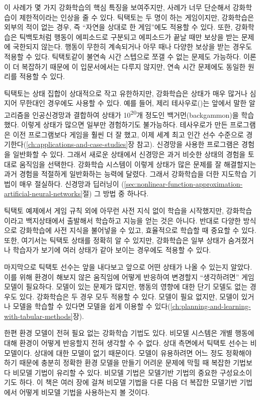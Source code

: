 이 사례가 몇 가지 강화학습의 핵심 특징을 보여주지만, 사례가 너무 단순해서
강화학습이 제한적이라는 인상을 줄 수 있다. 틱택토는 두 명이 하는 게임이지만,
강화학습은 외부의 적이 없는 경우, 즉 ``자연을 상대로 한 게임''에도 적용할 수
있다. 또한, 강화학습은 틱백토처럼 행동이 에피소드로 구분되고 에피소드가 끝날
때만 보상을 받는 문제에 국한되지 않는다. 행동이 무한히 계속되거나 아무 때나
다양한 보상을 받는 경우도 적용할 수 있다. 틱택토같이 불연속 시간 스텝으로 쪼갤
수 없는 문제도 가능하다. 이론이 더 복잡하기 때문에 이 입문서에서는 다루지
않지만, 연속 시간 문제에도 동일한 원리를 적용할 수 있다.

틱택토는 상태 집합이 상대적으로 작고 유한하지만, 강화학습은 상태가 매우 많거나
심지어 무한대인 경우에도 사용할 수 있다. 예를 들어, 제리
테사우로(\cite{Tesauro1992, Tesauro1995})는 앞에서 말한 알고리즘을 인공신경망과
결합하여 상태가 10\textsuperscript{20}개 정도인 백거먼(backgammon)을 학습했다.
이렇게 상태가 많으면 일부만 경험하기도 불가능하다. 테사우로가 만든 프로그램은
이전 프로그램보다 게임을 훨씬 더 잘 했고, 이제 세계 최고 인간 선수 수준으로
경기한다(\ref{ch:applications-and-case-studies}장 참고). 신경망을 사용한
프로그램은 경험을 일반화할 수 있다. 그래서 새로운 상태에서 신경망은 과거 비슷한
상태의 경험을 토대로 움직임을 선택한다. 강화학습 시스템이 이렇게 상태가 많은
문제를 잘 해결할지는 과거 경험을 적절하게 일반화하는 능력에 달렸다. 그래서
강화학습을 더한 지도학습 기법이 매우 절실하다. 신경망과 딥러닝이
(\ref{sec:nonlinear-function-approximation-artificial-neural-networks}절) 그
방법 중 하나다.

틱택토 예제에서 게임 규칙 외에 아무런 사전 지식 없이 학습을 시작했지만,
강화학습이라고 백지상태에서 출발해서 학습하고 지능을 얻는 것은 아니다. 반대로
다양한 방식으로 강화학습에 사전 지식을 불어넣을 수 있고, 효율적으로 학습할 때
중요할 수 있다. 또한, 여기서는 틱택토 상태를 정확히 알 수 있지만, 강화학습은
일부 상태가 숨겨졌거나 학습자가 보기에 여러 상태가 같아 보이는 경우에도 적용할
수 있다.


마지막으로 틱택토 선수는 앞을 내다보고 앞으로 어떤 상태가 나올 수 있는지 알았다.
이를 위해 환경이 해보지 않은 움직임에 어떻게 반응하여 변경할지 ``생각하려면''
게임 모델이 필요하다. 모델이 있는 문제가 많지만, 행동의 영향에 대한 단기 모델도
없는 경우도 있다. 강화학습은 두 경우 모두 적용할 수 있다. 모델이 필요 없지만,
모델이 있거나 모델을 학습할 수 있다면 모델을 쉽게 이용할 수
있다(\ref{ch:planning-and-learning-with-tabular-methods}장).

한편 환경 모델이 전혀 필요 없는 강화학습 기법도 있다. 비모델 시스템은 개별
행동에 대해 환경이 어떻게 반응할지 전혀 생각할 수 수 없다. 상대 측면에서 틱택토
선수는 비모델이다. 상대에 대한 모델이 없기 때문이다. 모델이 유용하려면 어느 정도
정확해야 하기 때문에 충분히 정확한 환경 모델을 만들기 어려운 문제에 막힐 때
복잡한 기법보다 비모델 기법이 유리할 수 있다. 비모델 기법은 모델기반 기법의
중요한 구성요소이기도 하다. 이 책은 여러 장에 걸쳐 비모델 기법을 다룬 다음 더
복잡한 모델기반 기법에서 어떻게 비모델 기법을 사용하는지 볼 것이다.

